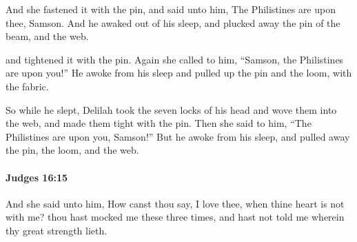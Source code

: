 			\begin{versebox}
					\item[BHS] 
					\item[ASV] And she fastened it with the pin, and said unto him, The Philistines are upon thee, Samson. And he awaked out of his sleep, and plucked away the pin of the beam, and the web.
					\item[NIV] and tightened it with the pin. Again she called to him, “Samson, the Philistines are upon you!” He awoke from his sleep and pulled up the pin and the loom, with the fabric.
					\item[NRSV] So while he slept, Delilah took the seven locks of his head and wove them into the web, and made them tight with the pin. Then she said to him, “The Philistines are upon you, Samson!” But he awoke from his sleep, and pulled away the pin, the loom, and the web.
			\end{versebox}

		\paragraph{Judges 16:15} %
			\label{JUDGES-16-15}

			And she said unto him, How canst thou say, I love thee, when thine heart is not with me? thou hast mocked me these three times, and hast not told me wherein thy great strength lieth.

